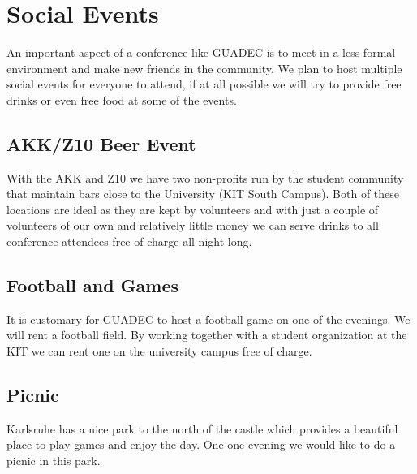 \newpage

\section{Social Events}

An important aspect of a conference like GUADEC is to meet in a less formal
environment and make new friends in the community. We plan to host multiple
social events for everyone to attend, if at all possible we will try to
provide free drinks or even free food at some of the events.

\begin{multicols}{2}
\raggedcolumns

\subsection{AKK/Z10 Beer Event}

With the AKK and Z10 we have two non-profits run by the student community that
maintain bars close to the University (KIT South Campus).
Both of these locations are ideal as they are kept by volunteers and with just
a couple of volunteers of our own and relatively little money we can
serve drinks to all conference attendees free of charge all night long.

\subsection{Football and Games}

It is customary for GUADEC to host a football game on one of the evenings. We will
rent a football field. By working together with a student organization at the
KIT we can rent one on the university campus free of charge.

\subsection{Picnic}

Karlsruhe has a nice park to the north of the castle which provides a beautiful
place to play games and enjoy the day. One one evening we would like to do
a picnic in this park.

\columnbreak


\end{multicols}
